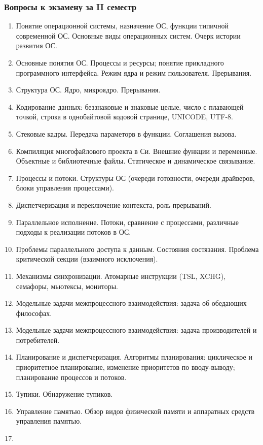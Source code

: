 \documentclass[a4paper,12pt]{article}
\begin{document}
\subsubsection*{Вопросы к экзамену за II семестр}
\begin{enumerate}
\item
Понятие операционной системы, назначение ОС, функции типичной современной ОС.
Основные виды операционных систем. Очерк истории развития ОС.
\item
Основные понятия ОС. Процессы и ресурсы; понятие прикладного программного интерфейса.
Режим ядра и режим пользователя. Прерывания.
\item
Структура ОС. Ядро, микроядро. Прерывания.
\item
Кодирование данных: беззнаковые и знаковые целые, число с плавающей точкой,
строка в однобайтовой кодовой странице, UNICODE, UTF-8.
\item
Стековые кадры. Передача параметорв в функции. Соглашения вызова.
\item
Компиляция многофайлового проекта в Си. Внешние функции и переменные.
Объектные и библиотечные файлы.	Статическое и динамическое связывание.
\item
Процессы и потоки. Структуры ОС (очереди готовности,
очереди драйверов, блоки управления процессами).
\item
Диспетчеризация и переключение контекста, роль прерываний.
\item
Параллельное исполнение. Потоки, сравнение с процессами, различные
подходы к реализации потоков в ОС.
\item
Проблемы параллельного доступа к данным. Состояния состязания.
Проблема критической секции (взаимного исключения).
\item
Механизмы синхронизации. Атомарные инструкции (TSL, XCHG), семафоры, мьютексы, мониторы.
\item
Модельные задачи межпроцессного взаимодействия: задача об обедающих философах.
\item
Модельные задачи межпроцессного взаимодействия: задача производителей и потребителей.
\item
Планирование и диспетчеризация. Алгоритмы планирования: циклическое и приоритетное планирование,
изменение приоритетов по вводу-выводу; планирование процессов и потоков.
\item
Тупики. Обнаружение тупиков.
\item
Управление памятью. Обзор видов физической памяти и аппаратных средств управления памятью.
\item

\end{enumerate}
\end{document}
